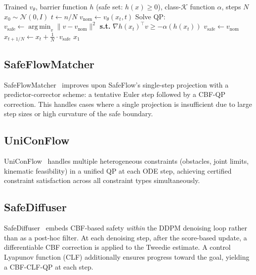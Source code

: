 \documentclass[11pt,letterpaper]{article}
\theoremstyle{plain}
\theoremstyle{definition}
\theoremstyle{remark}
\newcommand{\calN}{\mathcal{N}}
\newcommand{\grad}{\nabla}
\newcommand{\norm}[1]{\lVert #1\rVert}
\DeclareMathOperator*{\argmin}{arg\,min}
\begin{document}
\begin{algorithm}[ht]
\caption{SafeFlow: CBF-Filtered Flow Matching Sampling}\label{alg:safeflow}
\begin{algorithmic}[1]
\Require Trained $v_\theta$, barrier function $h$ (safe set: $h(x)\ge 0$),
  class-$\mathcal{K}$ function $\alpha$, steps $N$
\State $x_0\sim\calN(0,I)$
  \State $t\gets n/N$
  \State $v_\mathrm{nom}\gets v_\theta(x_t,t)$ 
  \If{$\grad h(x_t)^\top v_\mathrm{nom}<-\alpha(h(x_t))$} 
    \State Solve QP: $v_\mathrm{safe}\gets\argmin_{v}\norm{v-v_\mathrm{nom}}^2$
      \textbf{ s.t.} $\grad h(x_t)^\top v\ge-\alpha(h(x_t))$
  \Else
    \State $v_\mathrm{safe}\gets v_\mathrm{nom}$ 
  \EndIf
  \State $x_{t+1/N}\gets x_t+\frac{1}{N}\cdot v_\mathrm{safe}$
\EndFor
\State \Return $x_1$ 
\end{algorithmic}
\end{algorithm}

\subsection{SafeFlowMatcher}

SafeFlowMatcher~\citep{yang2025safeflowmatcher} improves upon
SafeFlow's single-step projection with a predictor-corrector scheme: a
tentative Euler step followed by a CBF-QP correction.  This handles
cases where a single projection is insufficient due to large step sizes
or high curvature of the safe boundary.

\subsection{UniConFlow}

UniConFlow~\citep{yang2025uniconflow} handles multiple heterogeneous
constraints (obstacles, joint limits, kinematic feasibility) in a
unified QP at each ODE step, achieving certified constraint
satisfaction across all constraint types simultaneously.

\subsection{SafeDiffuser}

SafeDiffuser~\citep{xiao2025safediffuser} embeds CBF-based safety
\emph{within} the DDPM denoising loop rather than as a post-hoc filter.
At each denoising step, after the score-based update, a differentiable
CBF correction is applied to the Tweedie estimate.  A control Lyapunov
function (CLF) additionally ensures progress toward the goal, yielding
a CBF-CLF-QP at each step.
\end{document}
